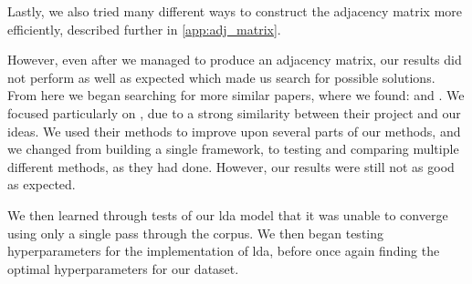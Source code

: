 Lastly, we also tried many different ways to construct the adjacency matrix more efficiently, described further in \autoref{app:adj_matrix}.

However, even after we managed to produce an adjacency matrix, our results did not perform as well as expected which made us search for possible solutions.
From here we began searching for more similar papers, where we found: \citet{yang2009topic} and \citet{Tang2008}.
We focused particularly on \cite{yang2009topic}, due to a strong similarity between their project and our ideas.
We used their methods to improve upon several parts of our methods, and we changed from building a single framework, to testing and comparing multiple different methods, as they had done.
However, our results were still not as good as expected.

We then learned through tests of our \gls{lda} model that it was unable to converge using only a single pass through the corpus.
We then began testing hyperparameters for the implementation of \gls{lda}, before once again finding the optimal hyperparameters for our dataset.
